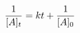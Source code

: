 \documentclass[preview]{standalone}
\begin{document}
\begin{align*}
\special{dvisvgm:raw <g id='unique000'>}\frac{1}{[A]_t} = kt + \frac{1}{[A]_0}\special{dvisvgm:raw </g>}
\end{align*}
\end{document}
